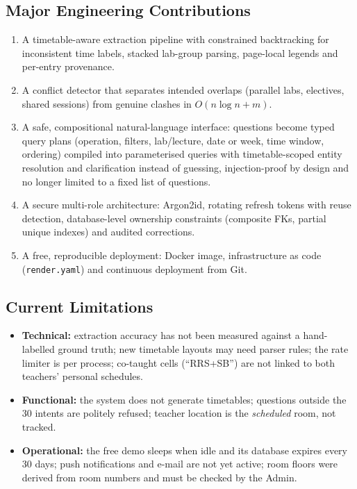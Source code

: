 \subsection{Major Engineering Contributions}
\begin{enumerate}
\item A timetable-aware extraction pipeline with constrained backtracking for inconsistent time labels,
      stacked lab-group parsing, page-local legends and per-entry provenance.
\item A conflict detector that separates intended overlaps (parallel labs, electives, shared sessions)
      from genuine clashes in $O(n\log n + m)$.
\item A safe, compositional natural-language interface: questions become typed query plans (operation,
      filters, lab/lecture, date or week, time window, ordering) compiled into parameterised queries with
      timetable-scoped entity resolution and clarification instead of guessing, injection-proof by design
      and no longer limited to a fixed list of questions.
\item A secure multi-role architecture: Argon2id, rotating refresh tokens with reuse detection,
      database-level ownership constraints (composite FKs, partial unique indexes) and audited corrections.
\item A free, reproducible deployment: Docker image, infrastructure as code (\texttt{render.yaml}) and
      continuous deployment from Git.
\end{enumerate}

\subsection{Current Limitations}
\begin{itemize}
\item \textbf{Technical:} extraction accuracy has not been measured against a hand-labelled ground truth;
      new timetable layouts may need parser rules; the rate limiter is per process; co-taught cells
      (``RRS+SB'') are not linked to both teachers' personal schedules.
\item \textbf{Functional:} the system does not generate timetables; questions outside the 30
      intents are politely refused; teacher location is the \emph{scheduled} room, not tracked.
\item \textbf{Operational:} the free demo sleeps when idle and its database expires every 30 days;
      push notifications and e-mail are not yet active; room floors were derived from room numbers and
      must be checked by the Admin.
\end{itemize}

